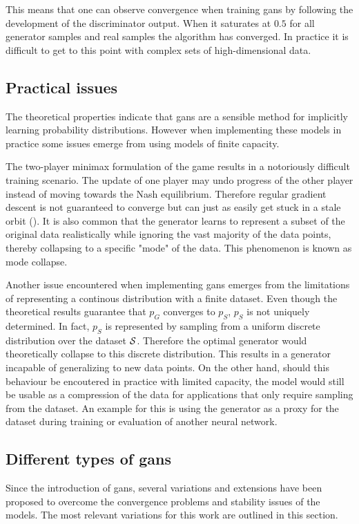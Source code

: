 This means that one can observe convergence when training \acrshort{gans} by following the development of the discriminator output. When it saturates at $0.5$ for all generator samples and real samples the algorithm has converged. In practice it is difficult to get to this point with complex sets of high-dimensional data.

\subsection{Practical issues}
The theoretical properties indicate that \acrshort{gans} are a sensible method for implicitly learning probability distributions. However when implementing these models in practice some issues emerge from using models of finite capacity. 

The two-player minimax formulation of the game results in a notoriously difficult training scenario. The update of one player may undo progress of the other player instead of moving towards the Nash equilibrium. Therefore regular gradient descent is not guaranteed to converge but can just as easily get stuck in a stale orbit (\textcite{salimans2016improved}). It is also common that the generator learns to represent a subset of the original data realistically while ignoring the vast majority of the data points, thereby collapsing to a specific "mode" of the data. This phenomenon is known as mode collapse.

Another issue encountered when implementing \acrshort{gans} emerges from the limitations of representing a continous distribution with a finite dataset. Even though the theoretical results guarantee that $p_G$ converges to $p_S$, $p_S$ is not uniquely determined. In fact, $p_S$ is represented by sampling from a uniform discrete distribution over the dataset $\mathcal{S}$. Therefore the optimal generator would theoretically collapse to this discrete distribution. This results in a generator incapable of generalizing to new data points. On the other hand, should this behaviour be encoutered in practice with limited capacity, the model would still be usable as a compression of the data for applications that only require sampling from the dataset. An example for this is using the generator as a proxy for the dataset during training or evaluation of another neural network.
 
\subsection{Different types of \acrshort{gans}}
Since the introduction of \acrshort{gans}, several variations and extensions have been proposed to overcome the convergence problems and stability issues of the models. The most relevant variations for this work are outlined in this section.

